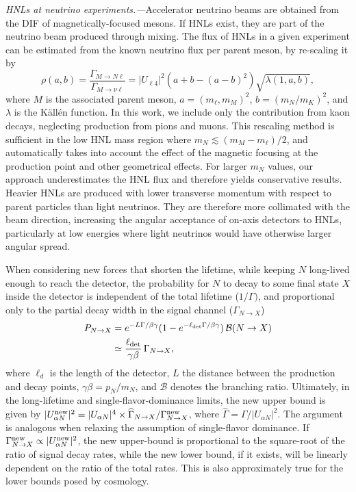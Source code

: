 \documentclass[
reprint,
superscriptaddress,
showpacs,
preprintnumbers,
bibnotes,
amsmath,
amssymb,
aps,
prd,
floatfix
]{revtex4-2}
\begin{document}
\emph{HNLs at neutrino experiments.---}Accelerator neutrino beams are obtained from the DIF of magnetically-focused mesons. 
If HNLs exist, they are part of the neutrino beam produced through mixing.
The flux of HNLs in a given experiment can be estimated from the known neutrino flux per parent meson, by re-scaling it by~\cite{Shrock:1980vy,Shrock:1980ct}
\begin{equation}
    \rho(a,b) = \frac{\Gamma_{M\to N \ell}}{\Gamma_{M\to \nu \ell}} = |U_{\ell 4}|^2 (a+b-(a-b)^2)\sqrt{\lambda(1,a,b)},
\end{equation}
where $M$ is the associated parent meson, $a=(m_\ell,m_M)^2$, $b=(m_N/m_K)^2$, and $\lambda$ is the K\"all\'en function. 
In this work, we include only the contribution from kaon decays, neglecting production from pions and muons.
This rescaling method is sufficient in the low HNL mass region where $m_N \lesssim  (m_M - m_\ell)/2$, and automatically takes into account the effect of the magnetic focusing at the production point and other geometrical effects.
For larger $m_N$ values, our approach underestimates the HNL flux and therefore yields conservative results.
Heavier HNLs are produced with lower transverse momentum with respect to parent particles than light neutrinos. 
They are therefore more collimated with the beam direction, increasing the angular acceptance of on-axis detectors to HNLs, particularly at low energies where light neutrinos would have otherwise larger angular spread.

When considering new forces that shorten the lifetime, while keeping $N$ long-lived enough to reach the detector, the probability for $N$ to decay to some final state $X$ inside the detector is independent of the total lifetime ($1/\Gamma)$, and proportional only to the partial decay width in the signal channel ($\Gamma_{N\to X}$) 
\begin{align}\label{eq:prob_decay}
    P_{N\to X} &= e^{-L \Gamma/\beta\gamma} (1- e^{-\ell_{\rm det} \Gamma/\beta\gamma }) \, \mathcal{B}(N\to X) 
    \\\nonumber 
    &\simeq \frac{\ell_{\rm det}}{\gamma\beta} \, \Gamma_{N\to X},
\end{align}
where $\ell_d$ is the length of the detector, $L$ the distance between the production and decay points, $\gamma\beta = p_N/m_N$, and $\mathcal{B}$ denotes the branching ratio. 
Ultimately, in the long-lifetime and single-flavor-dominance limits, the new upper bound is given by $|U_{\alpha N}^{\rm new}|^2  = |U_{\alpha N}|^4  \times \widehat{\Gamma}_{N\to X} / \Gamma_{N\to X}^{\rm new}$, where $\widehat{\Gamma} = \Gamma/|U_{\alpha N}|^2$. 
The argument is analogous when relaxing the assumption of single-flavor dominance. 
If $\Gamma_{N\to X}^{\rm new} \propto |U_{\alpha N}^{\rm new}|^2$, the new upper-bound is proportional to the square-root of the ratio of signal decay rates, while the new lower bound, if it exists, will be linearly dependent on the ratio of the total rates. 
This is also approximately true for the lower bounds posed by cosmology.
\end{document}

